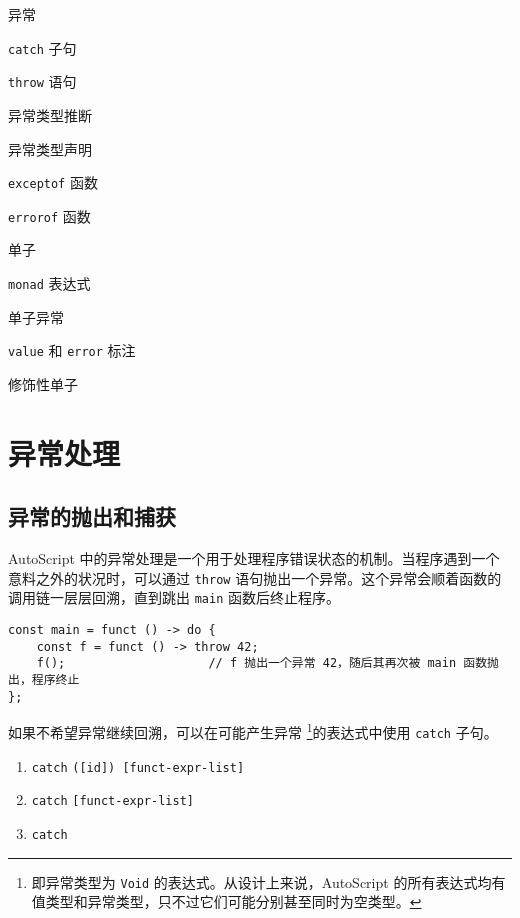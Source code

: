 \begin{introduction}
	\item 异常
	\item \lstinline!catch! 子句
	\item \lstinline!throw! 语句
	\item 异常类型推断
	\item 异常类型声明
	\item \lstinline!exceptof! 函数
	\item \lstinline!errorof! 函数
	\item 单子
	\item \lstinline!monad! 表达式
	\item 单子异常
	\item \lstinline!value! 和 \lstinline!error! 标注
	\item 修饰性单子
\end{introduction}

\section{异常处理}

\subsection{异常的抛出和捕获}

AutoScript 中的异常处理是一个用于处理程序错误状态的机制。当程序遇到一个意料之外的状况时，可以通过 \lstinline!throw! 语句抛出一个异常。这个异常会顺着函数的调用链一层层回溯，直到跳出 \lstinline!main! 函数后终止程序。

\begin{lstlisting}
const main = funct () -> do {
	const f = funct () -> throw 42;
	f();					// f 抛出一个异常 42，随后其再次被 main 函数抛出，程序终止
};
\end{lstlisting}

如果不希望异常继续回溯，可以在可能产生异常 \footnote{即异常类型为 \lstinline!Void! 的表达式。从设计上来说，AutoScript 的所有表达式均有值类型和异常类型，只不过它们可能分别甚至同时为空类型。}的表达式中使用 \lstinline!catch! 子句。

\begin{grammar} \label{grm:catch-clause}
\begin{enumerate}
	\item \lstinline!catch! \texttt{([id]) [funct-expr-list]}
	\item \lstinline!catch! \texttt{[funct-expr-list]}
	\item \lstinline!catch!
\end{enumerate}
\end{grammar}

